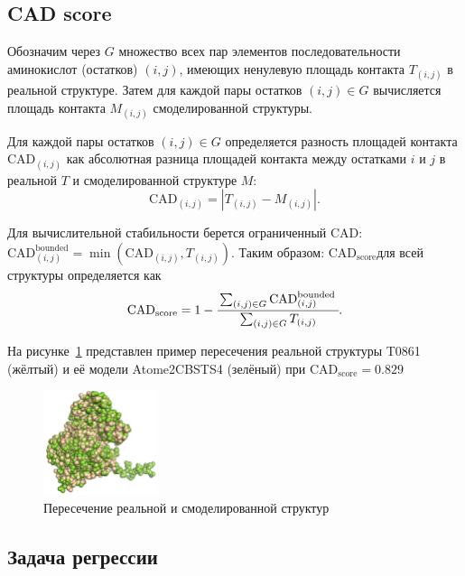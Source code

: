 \documentclass[14pt]{extarticle}
\begin{document}
\subsection{CAD score}



Обозначим через $G$ множество всех пар элементов последовательности аминокислот (остатков)  $(i, j)$, имеющих ненулевую площадь контакта $T_{(i, j)}$ в реальной структуре. Затем для каждой пары остатков $(i, j)\in G$ вычисляется площадь контакта $M_{(i, j)}$ смоделированной структуры. 

Для каждой пары остатков $(i, j) \in G$ определяется разность площадей контакта $\mathrm{CAD}_{(i, j)}$ как абсолютная разница площадей контакта между остатками $i$ и $j$ в реальной $T$ и смоделированной структуре $M$:
$$\mathrm{CAD}_{(i, j)}=\left|T_{(i, j)}-M_{(i, j)}\right|.$$

Для вычислительной стабильности берется ограниченный CAD: $\mathrm{CAD}_{(i, j)}^{\text {bounded}}=\min \left(\mathrm{CAD}_{(i, j)}, T_{(i, j)}\right)$. Таким образом:
$\text{CAD}_\text{score}$для всей структуры определяется как
\begin{align}
\mathrm{CAD}_\text{score}=1-\cfrac{\sum_{(i, j) \in G} \mathrm{CAD}_{(i, j)}^{\text {bounded }}}{\sum_{(i, j) \in G} T_{(i, j)}}.
\label{CAD_score}
\end{align}

На рисунке~\ref{CAD_example} представлен пример пересечения реальной структуры T0861 (жёлтый) и её модели Atome2\textunderscore CBS\textunderscore TS4 (зелёный) при $\mathrm{CAD}_\text{score}=0.829$
\begin{figure}[h]
	\centering
	\includegraphics[width=0.3\textwidth]{T0861_Atome2_CBS_TS4.pdf}
	\caption{Пересечение реальной и смоделированной структур}
	\label{CAD_example}
\end{figure}
\subsection{Задача регрессии}
\end{document}
